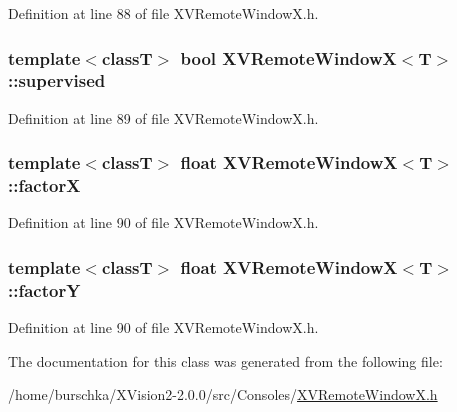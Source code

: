 Definition at line 88 of file XVRemote\-Window\-X.h.\label{XVRemoteWindowX_n5}
\hypertarget{class_XVRemoteWindowX_n5}{
\subsubsection[supervised]{\setlength{\rightskip}{0pt plus 5cm}template$<$classT$>$ bool XVRemote\-Window\-X$<$T$>$::supervised}}




Definition at line 89 of file XVRemote\-Window\-X.h.\label{XVRemoteWindowX_n6}
\hypertarget{class_XVRemoteWindowX_n6}{
\subsubsection[factorX]{\setlength{\rightskip}{0pt plus 5cm}template$<$classT$>$ float XVRemote\-Window\-X$<$T$>$::factor\-X}}




Definition at line 90 of file XVRemote\-Window\-X.h.\label{XVRemoteWindowX_n7}
\hypertarget{class_XVRemoteWindowX_n7}{
\subsubsection[factorY]{\setlength{\rightskip}{0pt plus 5cm}template$<$classT$>$ float XVRemote\-Window\-X$<$T$>$::factor\-Y}}




Definition at line 90 of file XVRemote\-Window\-X.h.

The documentation for this class was generated from the following file:\begin{CompactItemize}
\item 
/home/burschka/XVision2-2.0.0/src/Consoles/\hyperlink{XVRemoteWindowX.h-source}{XVRemote\-Window\-X.h}\end{CompactItemize}
